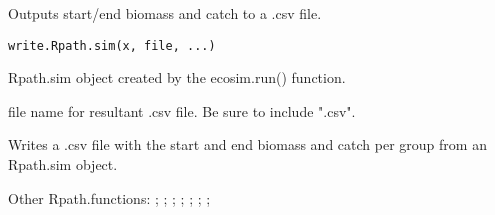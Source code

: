 \documentclass[a4paper]{book}
\begin{document}
%
\begin{Description}\relax
Outputs start/end biomass and catch to a .csv file.
\end{Description}
%
\begin{Usage}
\begin{verbatim}
write.Rpath.sim(x, file, ...)
\end{verbatim}
\end{Usage}
%
\begin{Arguments}
\begin{ldescription}
\item[\code{x}] Rpath.sim object created by the ecosim.run() function.

\item[\code{file}] file name for resultant .csv file.  Be sure to include ".csv".
\end{ldescription}
\end{Arguments}
%
\begin{Value}
Writes a .csv file with the start and end biomass and catch per group
from an Rpath.sim object.
\end{Value}
%
\begin{SeeAlso}\relax
Other Rpath.functions: ;
; ;
; ;
; ;
\end{SeeAlso}
\printindex{}
\end{document}
